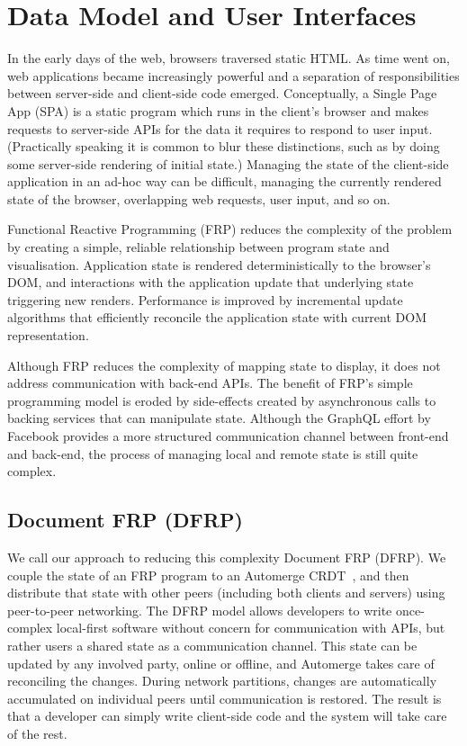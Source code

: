 \documentclass[sigplan,10pt]{acmart}
\begin{document}
\section{Data Model and User Interfaces}\label{sec:data-model-ui}

In the early days of the web, browsers traversed static HTML. As time went on, web applications became increasingly powerful and a separation of responsibilities between server-side and client-side code emerged. Conceptually, a Single Page App (SPA) is a static program which runs in the client's browser and makes requests to server-side APIs for the data it requires to respond to user input. (Practically speaking it is common to blur these distinctions, such as by doing some server-side rendering of initial state.) Managing the state of the client-side application in an ad-hoc way can be difficult, managing the currently rendered state of the browser, overlapping web requests, user input, and so on. 

Functional Reactive Programming (FRP) reduces the complexity of the problem by creating a simple, reliable relationship between program state and visualisation. Application state is rendered deterministically to the browser's DOM, and interactions with the application update that underlying state triggering new renders. Performance is improved by incremental update algorithms that efficiently reconcile the application state with current DOM representation.

Although FRP reduces the complexity of mapping state to display, it does not address communication with back-end APIs. The benefit of FRP's simple programming model is eroded by side-effects created by asynchronous calls to backing services that can manipulate state. Although the GraphQL effort by Facebook provides a more structured communication channel between front-end and back-end, the process of managing local and remote state is still quite complex.

\subsection{Document FRP (DFRP)}

We call our approach to reducing this complexity Document FRP (DFRP). We couple the state of an FRP program to an Automerge CRDT~\cite{Automerge,Automerge:2018}, and then distribute that state with other peers (including both clients and servers) using peer-to-peer networking. The DFRP model allows developers to write once-complex local-first software without concern for communication with APIs, but rather users a shared state as a communication channel. This state can be updated by any involved party, online or offline, and Automerge takes care of reconciling the changes. During network partitions, changes are automatically accumulated on individual peers until communication is restored. The result is that a developer can simply write client-side code and the system will take care of the rest.
\end{document}
